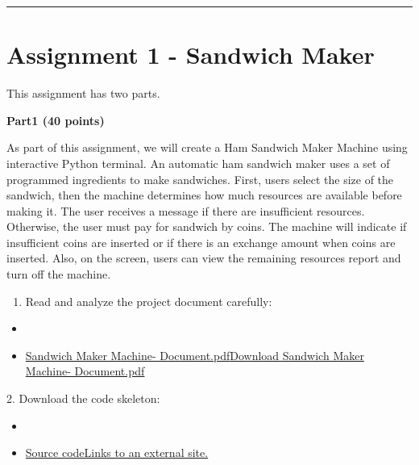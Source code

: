 \documentclass[
]{article}
\providecommand{\tightlist}{%
  \setlength{\itemsep}{0pt}\setlength{\parskip}{0pt}}
\begin{document}
\begin{center}\rule{0.5\linewidth}{0.5pt}\end{center}

\section{Assignment 1 - Sandwich
Maker}\label{assignment-1---sandwich-maker}

This assignment has two parts.

\textbf{Part1 (40 points)}

As part of this assignment, we will create a Ham Sandwich Maker Machine
using interactive Python terminal. An automatic ham sandwich maker uses
a set of programmed ingredients to make sandwiches. First, users select
the size of the sandwich, then the machine determines how much resources
are available before making it. The user receives a message if there are
insufficient resources. Otherwise, the user must pay for sandwich by
coins. The machine will indicate if insufficient coins are inserted or
if there is an exchange amount when coins are inserted. Also, on the
screen, users can view the remaining resources report and turn off the
machine.

\begin{enumerate}
\def\labelenumi{\arabic{enumi}.}
\tightlist
\item
  Read and analyze the project document carefully:~
\end{enumerate}

\begin{itemize}
\tightlist
\item
\end{itemize}

\begin{itemize}
\tightlist
\item
  \href{https://instructure.charlotte.edu/courses/264138/files/33808382?wrap=1}{Sandwich
  Maker Machine-
  Document.pdf}\href{https://instructure.charlotte.edu/courses/264138/files/33808382/download?download_frd=1}{Download
  Sandwich Maker Machine- Document.pdf}
\end{itemize}

2. Download the code skeleton:

\begin{itemize}
\tightlist
\item
\end{itemize}

\begin{itemize}
\tightlist
\item
  \href{https://github.com/samfallahian/ITSC3155-Assignments}{Source
  codeLinks to an external site.}
\end{itemize}
\end{document}
